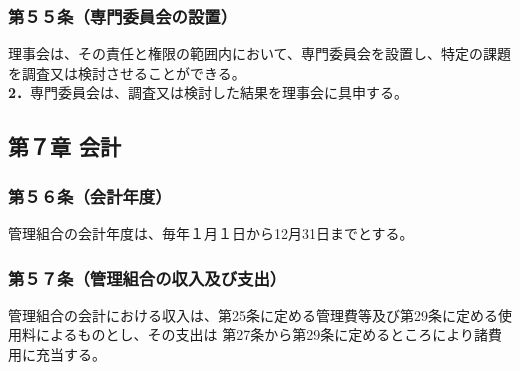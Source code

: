 \documentclass[
  luatex,
  paper=a4paper,
  fontsize=11pt,
  jafontsize=10pt,
  jlreq_notes,
]{jlreq}
\begin{document}
  \subsubsection*{第５５条（専門委員会の設置）}
  理事会は、その責任と権限の範囲内において、専門委員会を設置し、特定の課題を調査又は検討させることができる。\\
  \textbf{2．}専門委員会は、調査又は検討した結果を理事会に具申する。
  
  \begin{center}
  \subsection*{第７章 会計}
  \end{center}
  \subsubsection*{第５６条（会計年度）}
  管理組合の会計年度は、毎年１月１日から12月31日までとする。
  \subsubsection*{第５７条（管理組合の収入及び支出）}
  管理組合の会計における収入は、第25条に定める管理費等及び第29条に定める使用料によるものとし、その支出は
  第27条から第29条に定めるところにより諸費用に充当する。
\end{document}
